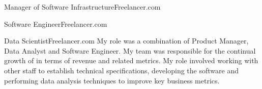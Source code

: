 \begin{professionalExperience}

{Manager of Software Infrastructure}{Freelancer.com}
{}

{Software Engineer}{Freelancer.com}
{}

{Data Scientist}{Freelancer.com}
{My role was a combination of Product Manager, Data Analyst and Software
Engineer. My team was responsible for the continual growth of
 in terms of revenue and related metrics. My role
involved working with other staff to establish technical specifications,
developing the software and performing data analysis techniques to improve key
business metrics.}

\end{professionalExperience}
